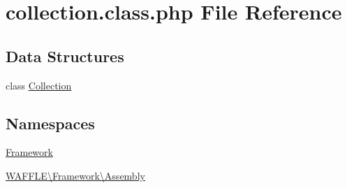 \hypertarget{collection_8class_8php}{}\section{collection.\+class.\+php File Reference}
\label{collection_8class_8php}
\subsection*{Data Structures}
\begin{DoxyCompactItemize}
\item 
class \hyperlink{class_w_a_f_f_l_e_1_1_framework_1_1_assembly_1_1_collection}{Collection}
\end{DoxyCompactItemize}
\subsection*{Namespaces}
\begin{DoxyCompactItemize}
\item 
 \hyperlink{namespace_framework}{Framework}
\item 
 \hyperlink{namespace_w_a_f_f_l_e_1_1_framework_1_1_assembly}{W\+A\+F\+F\+L\+E\textbackslash{}\+Framework\textbackslash{}\+Assembly}
\end{DoxyCompactItemize}
